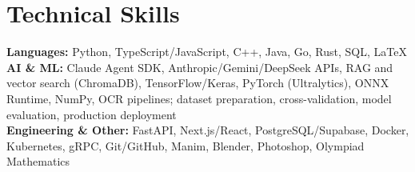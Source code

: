 \documentclass[a4paper,11pt]{article}
\newcommand{\resumeSubHeadingListStart}{\begin{itemize}[leftmargin=0.15in, label={}]}
\newcommand{\resumeSubHeadingListEnd}{\end{itemize}}
\begin{document}
\section{Technical Skills}
\vspace{2pt}
\resumeSubHeadingListStart
\small{\item{
  \textbf{Languages:}{ Python, TypeScript/JavaScript, C++, Java, Go, Rust, SQL, LaTeX} \\ \vspace{3pt}
  \textbf{AI \& ML:}{ Claude Agent SDK, Anthropic/Gemini/DeepSeek APIs, RAG and vector search (ChromaDB), TensorFlow/Keras, PyTorch (Ultralytics), ONNX Runtime, NumPy, OCR pipelines; dataset preparation, cross-validation, model evaluation, production deployment} \\ \vspace{3pt}
  \textbf{Engineering \& Other:}{ FastAPI, Next.js/React, PostgreSQL/Supabase, Docker, Kubernetes, gRPC, Git/GitHub, Manim, Blender, Photoshop, Olympiad Mathematics}
}}
\resumeSubHeadingListEnd
\end{document}
